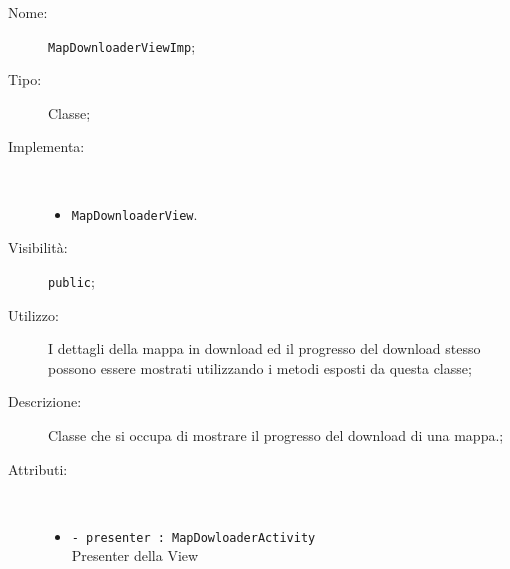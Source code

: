 \documentclass[../DefinizioneDiProdotto.tex]{subfiles}
\begin{document}
\begin{description}
	\item[Nome:] \texttt{MapDownloaderViewImp};
	\item[Tipo:] Classe;
	\item[Implementa:] \
	\begin{itemize}
		\item \texttt{MapDownloaderView}.
		
	\end{itemize}
	\item[Visibilità:] \texttt{public};
	\item[Utilizzo:] I dettagli della mappa in download ed il progresso del download stesso possono essere mostrati utilizzando i metodi esposti da questa classe;
	\item[Descrizione:] Classe che si occupa di mostrare il progresso del download di una mappa.;
	\item[Attributi:] \
	\begin{itemize}
		\item \texttt{- presenter : MapDowloaderActivity}\\
		Presenter della View
		

\end{itemize}
\end{description}
\end{document}
